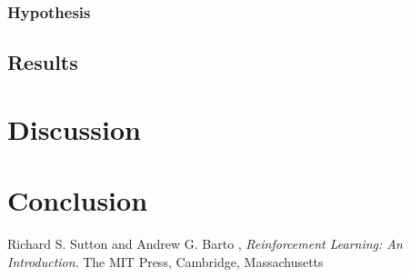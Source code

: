 \documentclass[a4paper,10pt]{article}
\begin{document}
\subsubsection{Hypothesis}


\subsection{Results}







\section{Discussion}



\section{Conclusion}


\begin{thebibliography}{9}

  Richard S. Sutton and Andrew G. Barto ,
  \emph{Reinforcement Learning: An Introduction}.
  The MIT Press, Cambridge, Massachusetts

\end{thebibliography}
\end{document}
